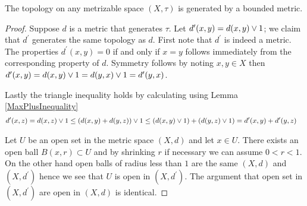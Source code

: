 \begin{prop}The topology on any metrizable space $(X,\tau)$  is generated by a bounded metric.
\end{prop}
\begin{proof}
Suppose $d$ is a metric that generates $\tau$.  Let $d^\prime(x,y) = d(x,y) \vee 1$; we claim that $d^\prime$ generates the same
topology as $d$.  First note that $d^\prime$ is indeed a metric.  The properties $d^\prime(x,y) = 0$ if and only if $x=y$ follows immediately from
the corresponding property of $d$.  Symmetry follows by noting $x,y \in X$ then $d^\prime(x,y) = d(x,y) \vee 1 = d(y,x) \vee 1 = d^\prime(y,x)$.  

Lastly the triangle inequality holds by calculating using Lemma \ref{MaxPlusInequality}
\begin{align*}
d^\prime(x,z) &= d(x,z) \vee 1 \leq (d(x,y) + d(y,z)) \vee 1 \leq (d(x,y) \vee 1) + (d(y,z) \vee 1) = d^\prime(x,y) + d^\prime(y,z)
\end{align*}

Let $U$ be an open set in the metric space $(X,d)$ and let $x \in U$.  There exists an open ball $B(x,r) \subset U$
and by shrinking $r$ if necessary we can assume $0 < r < 1$.  On the other hand open balls of radius less than $1$ are the same $(X,d)$ and
$(X,d^\prime)$ hence we see that $U$ is open in $(X,d^\prime)$.  The argument that open set in $(X,d^\prime)$ are open in $(X,d)$ is identical.
\end{proof}

